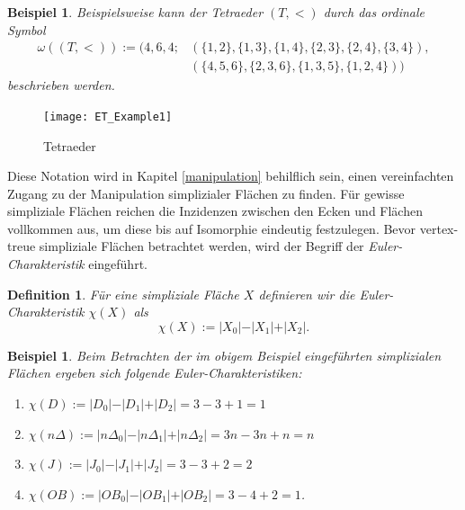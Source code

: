 \documentclass[12pt,titlepage,twoside,cleardoublepage]{article}
\theoremstyle{nummermitklammern}
\newtheorem{vor}[temp]{Vorüberlegung}
\newtheorem{bsp}[temp]{Beispiel}
\newtheorem{definition}[temp]{Definition}
\newtheorem{definition}[zahl]{Definition}
\newtheorem{vor}[zahl]{Vorüberlegung}
\newtheorem{bsp}[zahl]{Beispiel}
\numberwithin{equation}{section}
\begin{document}
\begin{bsp}
Beispielsweise kann der Tetraeder $(T,<)$ durch das ordinale Symbol 
\begin{align*}
\omega ((T,<)):=(4,6,4;&(\{1,2\}, \{1,3\},\{1,4\},\{2,3\},\{2,4\},\{3,4\}),\\
&(\{4,5,6\},\{2,3,6\},\{1,3,5\},\{1,2,4\}))
\end{align*}
beschrieben werden.
\end{bsp}
\begin{figure}[H]
\begin{center}
\texttt{[image: ET\_Example1]}
\end{center}
\caption{Tetraeder}
\end{figure}

Diese Notation wird in Kapitel \ref{manipulation} behilflich sein, einen vereinfachten Zugang zu der Manipulation simplizialer Flächen zu finden. Für gewisse simpliziale Flächen reichen die Inzidenzen zwischen den Ecken und Flächen vollkommen aus, um diese bis auf Isomorphie eindeutig festzulegen. Bevor vertex-treue simpliziale Flächen betrachtet werden, wird der Begriff der \emph{Euler-Charakteristik} eingeführt.
\begin{definition}{ \textsc{\cite{Rey}}}
Für eine simpliziale Fläche $X$ definieren wir die \emph{Euler-Charakteristik} $\chi (X)$ als 
\[
\chi(X):=\vert X_0\vert-\vert X_1\vert+\vert X_2\vert.
\]
\end{definition}
\begin{bsp}
Beim Betrachten der im obigem Beispiel eingeführten simplizialen Flächen ergeben sich folgende Euler-Charakteristiken:
\begin{enumerate}
\item $\chi(D):=\vert D_0\vert-\vert D_1\vert+\vert D_2\vert=3-3+1=1$
\item $\chi(n\Delta):=\vert n\Delta_0\vert-\vert n\Delta_1\vert+\vert n\Delta_2\vert=3n-3n+n=n$
\item $\chi(J):=\vert J_0\vert-\vert J_1\vert+\vert J_2\vert=3-3+2=2$
\item $\chi(OB):=\vert OB_0\vert-\vert OB_1\vert+\vert OB_2\vert=3-4+2=1$.
\end{enumerate}
\end{bsp}


\end{document}
